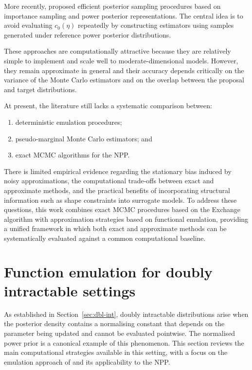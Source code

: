 More recently,  proposed efficient posterior sampling procedures based on importance sampling and power posterior representations.
The central idea is to avoid evaluating $c_0(\eta)$ repeatedly by constructing estimators using samples generated under reference power posterior distributions.

These approaches are computationally attractive because they are relatively simple to implement and scale well to moderate-dimensional models.
However, they remain approximate in general and their accuracy depends critically on the variance of the Monte Carlo estimators and on the overlap between the proposal and target distributions.

At present, the literature still lacks a systematic comparison between:
\begin{enumerate}[label=(\roman*)]
    \item deterministic emulation procedures;
    \item pseudo-marginal Monte Carlo estimators; and
    \item exact MCMC algorithms for the NPP.
\end{enumerate}

There is limited empirical evidence regarding the stationary bias induced by noisy approximations, the computational trade-offs between exact and approximate methods, and the practical benefits of incorporating structural information such as shape constraints into surrogate models.
To address these questions, this work combines exact MCMC procedures based on the Exchange algorithm with approximation strategies based on functional emulation, providing a unified framework in which both exact and approximate methods can be systematically evaluated against a common computational baseline.

\section{Function emulation for doubly intractable settings}


As established in Section~\ref{sec:dbl-int}, doubly intractable distributions arise when the posterior density contains a normalising constant that depends on the parameter being updated and cannot be evaluated pointwise.
The normalised power prior is a canonical example of this phenomenon.
This section reviews the main computational strategies available in this setting, with a focus on the emulation approach of  and its applicability to the NPP.

